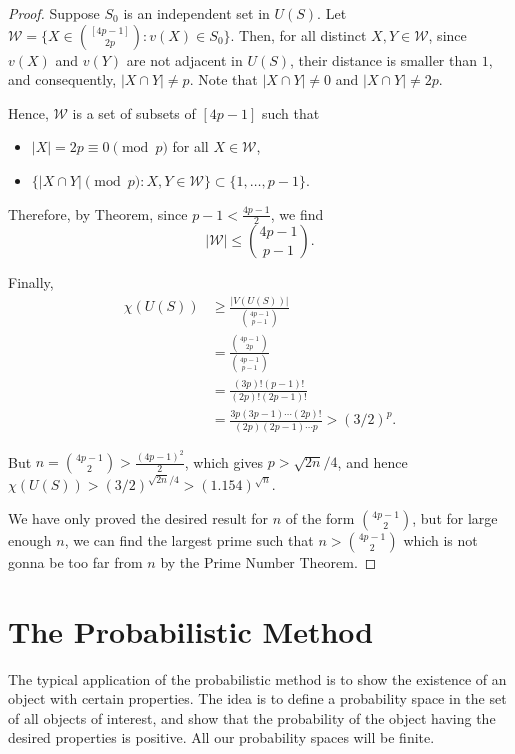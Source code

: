 \begin{proof}
    Suppose \(S_0\) is an independent set in \(U(S)\).
    Let \(\mathcal{W} = \{ X \in \binom{[4p-1]}{2p} : v(X) \in S_0 \}\).
    Then, for all distinct \(X, Y \in \mathcal{W}\),
    since \(v(X)\) and \(v(Y)\) are not adjacent in \(U(S)\),
    their distance is smaller than \(1\),
    and consequently, \(|X \cap Y| \neq p\).
    Note that \(|X \cap Y| \neq 0\) and \(|X \cap Y| \neq 2p\).

    Hence, \(\mathcal{W}\) is a set of subsets of \([4p-1]\) such that
    \begin{itemize}
        \item \(|X| = 2p \equiv 0 \pmod{p}\) for all \(X \in \mathcal{W}\),
        \item \(\{ |X \cap Y| \pmod{p} : X, Y \in \mathcal{W} \} \subset \{1, \dots, p-1\}\).
    \end{itemize}
    Therefore, by  Theorem, since \(p - 1 < \frac{4p-1}{2}\),
    we find
    \begin{equation}
        |\mathcal{W}| \leq \binom{4p-1}{p-1}.
    \end{equation}

    Finally,
    \begin{align}
        \chi(U(S)) &\geq \frac{|V(U(S))|}{\binom{4p-1}{p-1}} \\
                   &= \frac{\binom{4p-1}{2p}}{\binom{4p-1}{p-1}} \\
                   &= \frac{(3p)!(p-1)!}{(2p)!(2p-1)!} \\
                   &= \frac{ 3p (3p-1) \cdots (2p)! }{ (2p) (2p-1) \cdots p } > (3/2)^p.
    \end{align}

    But \(n = \binom{4p-1}{2} > \frac{(4p-1)^2}{2}\), which gives \(p > \sqrt{2n}/4\),
    and hence \(\chi(U(S)) > (3/2)^{\sqrt{2n}/4} > (1.154)^{\sqrt{n}}\).

    We have only proved the desired result for \(n\) of the form \(\binom{4p-1}{2}\),
    but for large enough \(n\), we can find the largest prime such that \(n > \binom{4p-1}{2}\) which is not gonna be too far from \(n\) by the Prime Number Theorem.
\end{proof}

\section{The Probabilistic Method}

The typical application of the probabilistic method is to show the existence of an object with certain properties.
The idea is to define a probability space in the set of all objects of interest,
and show that the probability of the object having the desired properties is positive.
All our probability spaces will be finite.

